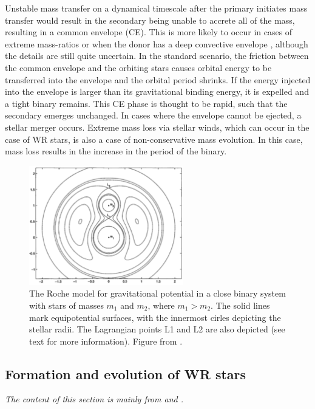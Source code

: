 Unstable mass transfer on a dynamical timescale after the primary initiates mass transfer would result in the secondary being unable to accrete all of the mass, resulting in a common envelope (CE). This is more likely to occur in cases of extreme mass-ratios or when the donor has a deep convective envelope \citep[see, e.g.,][]{ivanova_common_2013}, although the details are still quite uncertain. In the standard scenario, the friction between the common envelope and the orbiting stars causes orbital energy to be transferred into the envelope and the orbital period shrinks. If the energy injected into the envelope is larger than its gravitational binding energy, it is expelled and a tight binary remains. This CE phase is thought to be rapid, such that the secondary emerges unchanged. In cases where the envelope cannot be ejected, a stellar merger occurs. Extreme mass loss via stellar winds, which can occur in the case of WR stars, is also a case of non-conservative mass evolution. In this case, mass loss results in the increase in the period of the binary.

\begin{figure}
\centering
\includegraphics[width=0.6\textwidth]{chapters/introduction/image/RocheLobe.pdf}
\caption{The Roche model for gravitational potential in a close binary system with stars of masses $m_1$ and $m_2$, where $m_1>m_2$. The solid lines mark equipotential surfaces, with the innermost cirles depicting the stellar radii. The Lagrangian points L1 and L2 are also depicted (see text for more information). Figure from \citet{2001hilditch_close_binaries}.}
\label{fig:roche_lobes}
\end{figure}

\subsection{Formation and evolution of WR stars}

\textit{The content of this section is mainly from \citet{crowther_physical_2007} and \citet{shenar_why_2020}.}

